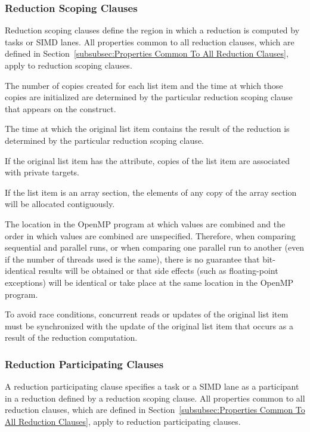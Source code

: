 \subsubsection{Reduction Scoping Clauses}
\label{subsubsec:Reduction Scoping Clauses}
Reduction scoping clauses define the region in which a reduction is computed by
tasks or SIMD lanes. All properties common to all reduction clauses,
which are defined in Section~\ref{subsubsec:Properties Common To All Reduction
Clauses}, apply to reduction scoping clauses.

The number of copies created for each list item and the time at which those
copies are initialized are determined by the particular reduction scoping clause
that appears on the construct.

The time at which the original list item contains the result of the reduction
is determined by the particular reduction scoping clause.

\begin{samepage}
\begin{fortranspecific}
If the original list item has the  attribute, copies of
the list item are associated with private targets.
\end{fortranspecific}
\end{samepage}

If the list item is an array section, the elements of any copy of the array section will
be allocated contiguously.

The location in the OpenMP program at which values are combined and the
order in which values are combined are unspecified. Therefore, when
comparing sequential and parallel runs, or when comparing one parallel run to
another (even if the number of threads used is the same), there is no guarantee
that bit-identical results will be obtained or that side effects (such as
floating-point exceptions) will be identical or take place at the same location
in the OpenMP program.

To avoid race conditions, concurrent reads or updates of the original list item
must be synchronized with the update of the original list item that occurs as a
result of the reduction computation.










\subsubsection{Reduction Participating Clauses}
\label{subsubsec:Reduction Participating Clauses}
A reduction participating clause specifies a task or a SIMD lane as a
participant in a reduction defined by a reduction scoping clause.
All properties common to all reduction clauses, which are defined in
Section~\ref{subsubsec:Properties Common To All Reduction Clauses}, apply to
reduction participating clauses.

